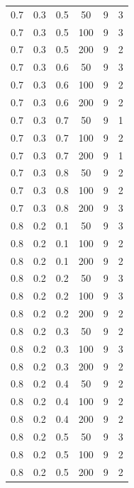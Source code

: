 \documentclass[a4paper,14pt, unknownkeysallowed]{extreport}
\begin{document}
\begin{center}
\begin{longtable}[c]{|c|c|c|c|c|c|}
        \hline
         0.7 &  0.3 &  0.5 &   50 &     9 &     3 \\
         0.7 &  0.3 &  0.5 &  100 &     9 &     3 \\
         0.7 &  0.3 &  0.5 &  200 &     9 &     2 \\
        \hline
         0.7 &  0.3 &  0.6 &   50 &     9 &     3 \\
         0.7 &  0.3 &  0.6 &  100 &     9 &     2 \\
         0.7 &  0.3 &  0.6 &  200 &     9 &     2 \\
        \hline
         0.7 &  0.3 &  0.7 &   50 &     9 &     1 \\
         0.7 &  0.3 &  0.7 &  100 &     9 &     2 \\
         0.7 &  0.3 &  0.7 &  200 &     9 &     1 \\
        \hline
         0.7 &  0.3 &  0.8 &   50 &     9 &     2 \\
         0.7 &  0.3 &  0.8 &  100 &     9 &     2 \\
         0.7 &  0.3 &  0.8 &  200 &     9 &     3 \\
        \hline
         0.8 &  0.2 &  0.1 &   50 &     9 &     3 \\
         0.8 &  0.2 &  0.1 &  100 &     9 &     2 \\
         0.8 &  0.2 &  0.1 &  200 &     9 &     2 \\
        \hline
         0.8 &  0.2 &  0.2 &   50 &     9 &     3 \\
         0.8 &  0.2 &  0.2 &  100 &     9 &     3 \\
         0.8 &  0.2 &  0.2 &  200 &     9 &     2 \\
        \hline
         0.8 &  0.2 &  0.3 &   50 &     9 &     2 \\
         0.8 &  0.2 &  0.3 &  100 &     9 &     3 \\
         0.8 &  0.2 &  0.3 &  200 &     9 &     2 \\
        \hline
         0.8 &  0.2 &  0.4 &   50 &     9 &     2 \\
         0.8 &  0.2 &  0.4 &  100 &     9 &     2 \\
         0.8 &  0.2 &  0.4 &  200 &     9 &     2 \\
        \hline
         0.8 &  0.2 &  0.5 &   50 &     9 &     3 \\
         0.8 &  0.2 &  0.5 &  100 &     9 &     2 \\
         0.8 &  0.2 &  0.5 &  200 &     9 &     2 \\

\end{longtable}
\end{center}
\end{document}
